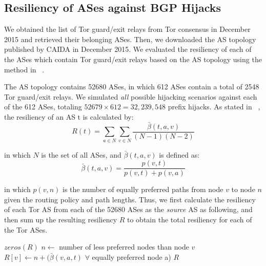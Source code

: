 \subsection{Resiliency of ASes against BGP Hijacks}

We obtained the list of Tor guard/exit relays from Tor consensus in December 2015 and retrieved their belonging ASes. Then, we downloaded the AS topology published by CAIDA in December 2015. We evaluated the resiliency of each of the ASes which contain Tor guard/exit relays based on the AS topology using the method in ~\cite{lad2007understanding}. 

The AS topology contains 52680 ASes, in which 612 ASes contain a total of 2548 Tor guard/exit relays. We simulated \emph{all} possible hijacking scenarios against each of the 612 ASes, totaling $52679 \times 612 = 32,239,548$ prefix hijacks. As stated in ~\cite{lad2007understanding}, the resiliency of an AS t is calculated by:
\begin{equation}
R(t) = \sum_{a \in N} \sum_{v \in N} \frac {\bar{\beta}(t,a,v)} {(N-1)(N-2)}
\end{equation}

in which $N$ is the set of all ASes, and $\bar{\beta}(t,a,v)$ is defined as:
\begin{equation}
\bar{\beta}(t,a,v) = \frac {p(v,t)} {p(v,t) + p(v,a)}
\end{equation}

in which $p(v,n)$ is the number of equally preferred paths from node $v$ to node $n$ given the routing policy and path lengths. Thus, we first calculate the resiliency of each Tor AS from each of the 52680 ASes as the \emph{source} AS as following, and then sum up the resulting resiliency $R$ to obtain the total resiliency for each of the Tor ASes. 

\begin{algorithmic}
    \State {}
    \State $zeros(R)$
		\State $n \gets $ number of less preferred nodes than node $v$
		\State $R[v] \gets n + (\bar{\beta}(v,a,t)$ $\forall$ equally preferred node a)
	\EndIf
    \EndFor
    \State \Return $R$
\EndFunction
\end{algorithmic}

